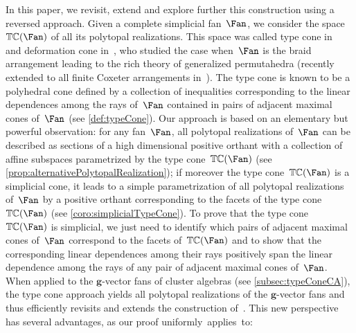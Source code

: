 \documentclass{amsart}
\theoremstyle{definition}
\renewcommand{\b}[1]{{\boldsymbol{#1}}} %
\newcommand{\typeCone}{\mathbb{TC}} %
\begin{document}
\medskip
In this paper, we revisit, extend and explore further this construction using a reversed approach.
Given a complete simplicial fan~$\Fan$, we consider the space~$\typeCone(\Fan)$ of all its polytopal realizations.
This space was called type cone in~\cite{McMullen-typeCone} and deformation cone in~\cite{Postnikov, PostnikovReinerWilliams}, who studied the case when~$\Fan$ is the braid arrangement leading to the rich theory of generalized permutahedra (recently extended to all finite Coxeter arrangements in~\cite{ArdilaCastilloEurPostnikov}).
The type cone is known to be a polyhedral cone defined by a collection of inequalities corresponding to the linear dependences among the rays of~$\Fan$ contained in pairs of adjacent maximal cones of~$\Fan$ (see \cref{def:typeCone}).
Our approach is based on an elementary but powerful observation: for any fan~$\Fan$, all polytopal realizations of~$\Fan$ can be described as sections of a high dimensional positive orthant with a collection of affine subspaces parametrized by the type cone~$\typeCone(\Fan)$ (see \cref{prop:alternativePolytopalRealization}); if moreover the type cone~$\typeCone(\Fan)$ is a simplicial cone, it leads to a simple parametrization of all polytopal realizations of~$\Fan$ by a positive orthant corresponding to the facets of the type cone~$\typeCone(\Fan)$ (see \cref{coro:simplicialTypeCone}).
To prove that the type cone~$\typeCone(\Fan)$ is simplicial, we just need to identify which pairs of adjacent maximal cones of~$\Fan$ correspond to the facets of~$\typeCone(\Fan)$ and to show that the corresponding linear dependences among their rays positively span the linear dependence among the rays of any pair of adjacent maximal cones of~$\Fan$.
When applied to the $\b{g}$-vector fans of cluster algebras (see \cref{subsec:typeConeCA}), the type cone approach yields all polytopal realizations of the $\b{g}$-vector fans and thus efficiently revisits and extends the construction of~\cite{BazierMatteDouvilleMousavandThomasYildirim}.
This new perspective has several advantages, as our proof uniformly~applies~to:
\end{document}
